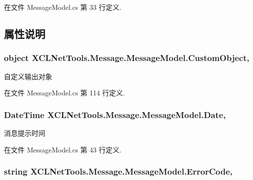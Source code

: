 在文件 Message\-Model.\-cs 第 33 行定义.



\subsection{属性说明}
\hypertarget{class_x_c_l_net_tools_1_1_message_1_1_message_model_a1f5c9fd605c8bfeb76563ccc8272510c}{
\subsubsection[{Custom\-Object}]{\setlength{\rightskip}{0pt plus 5cm}object X\-C\-L\-Net\-Tools.\-Message.\-Message\-Model.\-Custom\-Object\hspace{0.3cm}{\ttfamily [get]}, {\ttfamily [set]}}}\label{class_x_c_l_net_tools_1_1_message_1_1_message_model_a1f5c9fd605c8bfeb76563ccc8272510c}


自定义输出对象 



在文件 Message\-Model.\-cs 第 114 行定义.

\hypertarget{class_x_c_l_net_tools_1_1_message_1_1_message_model_a29a69610fff39e33d85105a5ca50dd20}{
\subsubsection[{Date}]{\setlength{\rightskip}{0pt plus 5cm}Date\-Time X\-C\-L\-Net\-Tools.\-Message.\-Message\-Model.\-Date\hspace{0.3cm}{\ttfamily [get]}, {\ttfamily [set]}}}\label{class_x_c_l_net_tools_1_1_message_1_1_message_model_a29a69610fff39e33d85105a5ca50dd20}


消息提示时间 



在文件 Message\-Model.\-cs 第 43 行定义.

\hypertarget{class_x_c_l_net_tools_1_1_message_1_1_message_model_a5c8290fdf8dd088943d6468819bc4d7c}{
\subsubsection[{Error\-Code}]{\setlength{\rightskip}{0pt plus 5cm}string X\-C\-L\-Net\-Tools.\-Message.\-Message\-Model.\-Error\-Code\hspace{0.3cm}{\ttfamily [get]}, {\ttfamily [set]}}}\label{class_x_c_l_net_tools_1_1_message_1_1_message_model_a5c8290fdf8dd088943d6468819bc4d7c}


